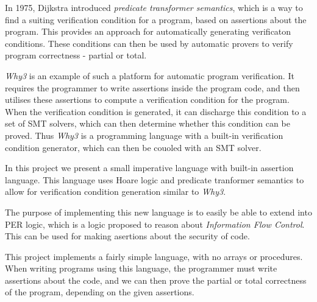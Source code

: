 In 1975, Dijkstra introduced \textit{predicate transformer semantics}, which is a way to find a suiting verification condition for a program, based on assertions about the program.
This provides an approach for automatically generating verificaton conditions.
These conditions can then be used by automatic provers to verify program correctness - partial or total.


\textit{Why3} is an example of such a platform for automatic program verification. It requires the programmer to write assertions inside the program code, and then utilises these assertions to compute a verification condition for the program.
When the verification condition is generated, it can discharge this condition to a set of SMT solvers, which can then determine whether this condition can be proved.
Thus \textit{Why3} is a programming language with a built-in verification condition generator, which can then be couoled with an SMT solver.

In this project we present a small imperative language with built-in assertion language.
This language uses Hoare logic and predicate tranformer semantics to allow for verification condition generation similar to \textit{Why3}. %

The purpose of implementing this new language is to easily be able to extend into PER logic, which is a logic proposed to reason about \textit{Information Flow Control}.
This can be used for making asertions about the security of code.

This project implements a fairly simple language, with no arrays or procedures. When writing programs using this language, the programmer must write assertions about the code, and we can then prove the partial or total correctness of the program, depending on the given assertions.


















